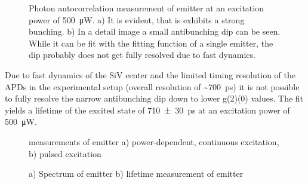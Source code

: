 	\begin{figure}[tp]
		\begin{subfigure}[t]{ 0.49\linewidth}
			\centering
			\caption{}
			\label{subfig::g2_fast_detail}
		\end{subfigure}
		\hfill
		\begin{subfigure}[t]{ 0.49\linewidth}
			\centering
			\caption{}
			\label{subfig::g2_fast_all}
		\end{subfigure}
		\caption{Photon autocorrelation measurement of emitter  at an excitation power of \SI{500}{\micro\watt}. a) It is evident, that is exhibits a strong bunching. b) In a detail image a small antibunching dip can be seen. While it can be fit with the fitting function of a single emitter, the dip probably does not get fully resolved due to fast dynamics.}
		\label{fig::g2_fast}

	\end{figure}
	Due to fast dynamics of the SiV center and the limited timing resolution of the APDs in the experimental setup (overall resolution of  \textasciitilde{}\SI{700}{ps}) it is not possible to fully resolve the narrow antibunching dip down to lower g(2)(0) values. The fit yields a lifetime of the excited state of \SI{710\pm30}{ps} at an excitation power of \SI{500}{\micro\watt}.
	\\
	\begin{figure}[tp]
		\begin{subfigure}[t]{ 0.49\linewidth}
			\centering
			\caption{}
			\label{subfig::erlangen_g2_all}
		\end{subfigure}
		\hfill
		\begin{subfigure}[t]{ 0.49\linewidth}
			\centering
			\caption{}
			\label{subfig::erlangen_g2_pulsed}
		\end{subfigure}
		\caption{\gtz measurements of emitter  a) power-dependent, continuous excitation, b) pulsed excitation}
		\label{fig::erlangen_g2}
	\end{figure}

	\begin{figure}[tp]
		\begin{subfigure}[t]{ 0.49\linewidth}
			\centering
			\caption{}
			\label{subfig::erlangen_spectrum}
		\end{subfigure}
		\hfill
		\begin{subfigure}[t]{ 0.49\linewidth}
			\centering
			\caption{}
			\label{subfig::erlangen_lifetime}
		\end{subfigure}
		\caption{a) Spectrum of emitter  b) lifetime measurement of emitter }
		\label{fig::erlangen_spectrum_lifetime}
	\end{figure}

